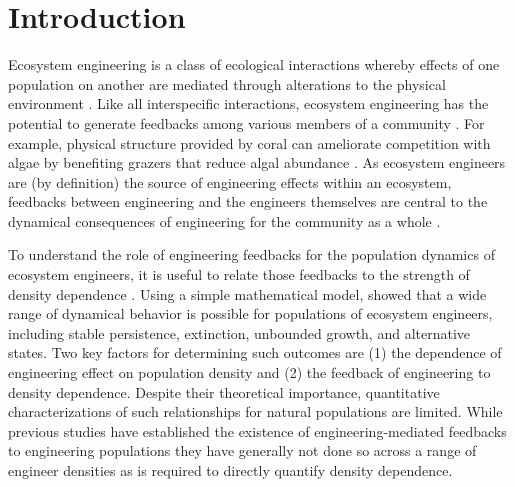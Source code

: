 \section*{Introduction}

Ecosystem engineering is a class of ecological interactions whereby effects of one
population on another are mediated through alterations to the physical environment
\citep{jones1994, wilby2002}.
Like all interspecific interactions, 
ecosystem engineering has the potential to generate feedbacks among various 
members of a community \citep{bertness1997,largaespada2012,donadi2014,sanders2014}.
For example, physical structure provided by coral can ameliorate competition with algae by
benefiting grazers that reduce algal abundance \citep{bozec2013}. 
As ecosystem engineers are (by definition) the source of engineering effects within
an ecosystem, 
feedbacks between engineering and the engineers themselves
are central to the dynamical consequences of engineering for the 
community as a whole \citep{hastings2007, sanders2014}. 

To understand the role of engineering feedbacks
for the population dynamics of ecosystem engineers,
it is useful to relate those feedbacks to the strength of density dependence
\citep{hastings2007, cuddington2009}.
Using a simple mathematical model,
\cite{cuddington2009} showed that a wide range of dynamical behavior
is possible for populations of ecosystem engineers,
including stable persistence, extinction, unbounded growth, and alternative states.
Two key factors for determining such outcomes are 
(1) the dependence of engineering effect on population density and 
(2) the feedback of engineering to density dependence.
Despite their theoretical importance,
quantitative characterizations of such relationships for natural populations are limited.
While previous studies have established the existence of engineering-mediated feedbacks
to engineering populations \citep[e.g.,][]{bozec2013, donadi2014, largaespada2012}
they have generally not done so across a range of engineer densities 
as is required to directly quantify density dependence.
 
